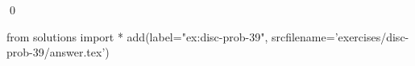 
\begin{ex} 
  \label{ex:disc-prob-39}
  
  \qed
\end{ex} 
\begin{python0}
from solutions import *
add(label="ex:disc-prob-39",
    srcfilename='exercises/disc-prob-39/answer.tex') 
\end{python0}
